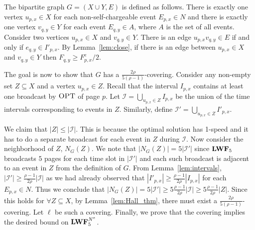 \documentclass[11pt]{article}
\newcommand{\opt}{\textrm{\sc OPT}}
\newcommand{\len}{\mathfrak{\rho}}
\newcommand{\fe}{F^e}
\newcommand{\lwfne}{\lwf^{N^e}}
\begin{document}
\begin{titlepage}
The bipartite graph $G=(X \cup Y, E)$ is defined as follows.  There is
exactly one vertex $u_{p,x} \in X$ for each non-self-chargeable event
$E_{p,x} \in N$ and there is exactly one vertex $v_{q,y} \in Y$ for
each event $E_{q,y} \in A$, where $A$ is the set of all events. Consider two vertices $u_{p,x} \in X$ and
$v_{q,y} \in Y$. There is an edge $u_{p,x}v_{q,y} \in E$ if and only
if $e_{q,y} \in I'_{p,x}$.  By Lemma~\ref{lem:close}, if there is an
edge between $u_{p,x} \in X$ and $v_{q,y} \in Y$ then $ F_{q,y} \ge
\fe_{p,x}/2$.

The goal is now to show that $G$ has a $\frac{2
  \len}{5(\len-1)}$-covering. Consider any non-empty set $Z \subseteq
X$ and a vertex $u_{p,x} \in Z$. Recall that the interval $I_{p,x}$
contains at least one broadcast by $\opt$ of page $p$. Let
$\mathcal{I} = \bigcup_{u_{p,x} \in Z } I_{p,x}$ be the union of the
time intervals corresponding to events in $Z$. Similarly, define
$\mathcal{I}' = \bigcup_{u_{p,x} \in Z } I'_{p,x}$.

We claim that $|Z| \leq |\mathcal{I}|$. This is because the optimal
solution has 1-speed and it has to do a separate broadcast for each
event in $Z$ during $\mathcal{I}$. Now consider the neighborhood of
$Z$, $N_G(Z)$.  We note that $|N_G(Z)| = 5 |\mathcal{I}'|$ since
${\texttt{\bf{LWF}}}_5$ broadcasts $5$ pages for each time slot in $|\mathcal{I}'|$
and each such broadcast is adjacent to an event in $Z$ from the
definition of $G$.  From Lemma~\ref{lem:intervals}, $|\mathcal{I}'|
\ge \frac{\len-1}{2\len} |\mathcal{I}|$ as we had already observed
that $|I'_{p,x}| \ge \frac{\len-1}{2\len}|I_{p,x}|$ for each $E_{p,x}
\in N$. Thus we conclude that $|N_G(Z)| = 5 |\mathcal{I}'| \ge
5\frac{\len-1}{2\len} |\mathcal{I}| \ge 5\frac{\len-1}{2\len}
|Z|$. Since this holds for $\forall Z \subseteq X$, by
Lemma~\ref{lem:Hall_thm}, there must exist a $\frac{2 \len }{5(\len
  -1)}$-covering. Let $\ell$ be such a covering. Finally, we prove
that the covering implies the desired bound on $\lwfne_{5}$. \vspace{-2.5mm}


\end{titlepage}
\end{document}

